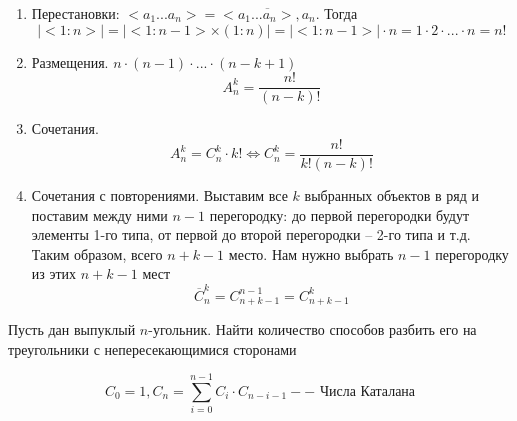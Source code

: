 \documentclass[12pt]{article}
\newenvironment{MyList}[1][4pt]{
  \begin{enumerate}[1.]
  \setlength{\parskip}{0pt}
  \setlength{\itemsep}{#1}
}{       
  \end{enumerate}
}
\def\EQ{\Leftrightarrow} %
\theoremstyle{definition} %
\theoremstyle{plain} %
\theoremstyle{remark} %
\begin{document}
\begin{MyList}
    \item Перестановки: $<a_1 ... a_n> = \overline{<a_1 ... a_n>, a_n}$. Тогда
    \[|<1:n>| = |<1:n - 1> \times (1:n)| = |<1:n - 1>| \cdot n = 1 \cdot 2 \cdot ... \cdot n = n!\]

    \item Размещения. $n \cdot (n - 1) \cdot ... \cdot (n - k + 1)$
    \[A_n^k = \frac{n!}{(n - k)!}\]

    \item Сочетания. 
    \[A_n^k = C_n^k \cdot k! \EQ C_n^k = \frac{n!}{k!(n - k)!}\]

    \item Сочетания с повторениями. Выставим все $k$ выбранных объектов в ряд и поставим между ними $n - 1$ перегородку: до первой перегородки будут элементы 1-го типа, от первой до второй перегородки -- 2-го типа и т.д.
    Таким образом, всего $n + k - 1$ место. Нам нужно выбрать $n - 1$ перегородку из этих $n + k - 1$ мест
    \[\overline{C}_n^k = C_{n + k - 1}^{n - 1} = C_{n + k - 1}^k\]
\end{MyList}

Пусть дан выпуклый $n$-угольник. Найти количество способов разбить его на треугольники с непересекающимися сторонами

\[C_0 = 1, C_n = \sum_{i=0}^{n - 1} C_i \cdot C_{n - i - 1} -- \text{ Числа Каталана}\]
\end{document}
